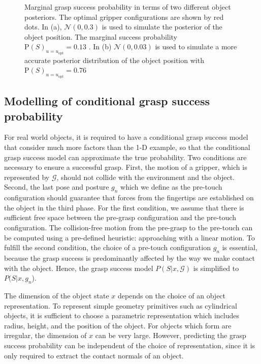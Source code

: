 \begin{figure}[!htbp]
\centering
\def\svgwidth{1\linewidth}

\caption{ Marginal grasp success probability in terms of two different object posteriors. The optimal gripper configurations are shown by red dots. In (a), $\mathcal{N}(0, 0.3)$ is used to simulate the posterior of the object position. The marginal success probability ${\text{P}(S)}_{u = u_{\text{opt}}} = 0.13$  . In (b) $\mathcal{N}(0, 0.03)$ is used to simulate a more accurate posterior distribution of the object position with ${\text{P}(S)}_{u = u_{\text{opt}}} = 0.76$ }
\label{fig:1D_grasp}
\end{figure}	 


\subsection{Modelling of conditional grasp success probability } \label{sec:grasp_success_model}
For real world objects, it is required to have a conditional grasp success model that consider much more factors than the 1-D example, so that the conditional grasp success model can approximate the true probability. Two conditions are necessary to ensure a successful grasp. First, the motion of a gripper, which is represented by $\mathcal{G}$, should not collide with the environment and the object. Second, the last pose and posture $g_n$ which we define as the pre-touch configuration should guarantee that forces from the fingertips are established on the object in the third phase. For the first condition, we assume that there is sufficient free space between the pre-grasp configuration and the pre-touch configuration. The collision-free motion from the pre-grasp to the pre-touch can be computed using a pre-defined heuristic: approaching with a linear motion. To fulfill the second condition, the choice of a pre-touch configuration $g_n$ is essential, because the grasp success is predominantly affected by the way we make contact with the object. Hence, the grasp success model $P(S | x,\mathcal{G})$ is simplified to $P(S | x, g_n$). 

The dimension of the object state $x$ depends on the choice of an object representation. To represent simple geometry primitives such as cylindrical objects, it is sufficient to choose a parametric representation which includes radius, height, and the position of the object. For objects which form are irregular, the dimension of $x$ can be very large. However, predicting the grasp success probability can be independent of the choice of representation, since it is only required to extract the contact normals of an object.  

